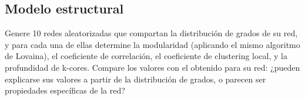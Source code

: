\documentclass[12pt]{article}
\begin{document}
\subsection{Modelo estructural} Genere 10 redes aleatorizadas que compartan la distribución de grados de su red, y para cada una de ellas determine la modularidad (aplicando el mismo algoritmo de Lovaina), el coeficiente de correlación, el coeficiente de clustering local, y la profundidad de k-cores. Compare los valores con el obtenido para su red: ¿pueden explicarse sus valores a partir de la distribución de grados, o parecen ser propiedades específicas de la red?
\end{document}
